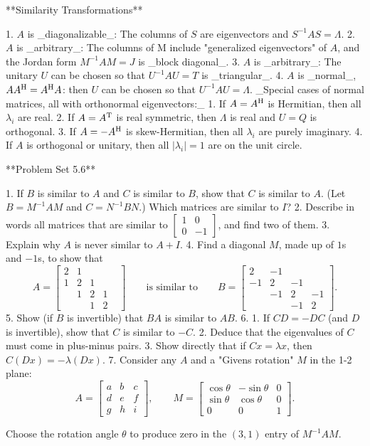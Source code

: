 

**Similarity Transformations**

1. \(A\) is _diagonalizable_: The columns of \(S\) are eigenvectors and \(S^{-1}AS=\Lambda\).
2. \(A\) is _arbitrary_: The columns of M include "generalized eigenvectors" of \(A\), and the Jordan form \(M^{-1}AM=J\) is _block diagonal_.
3. \(A\) is _arbitrary_: The unitary \(U\) can be chosen so that \(U^{-1}AU=T\) is _triangular_.
4. \(A\) is _normal_, \(AA^{\rm H}=A^{\rm H}A\): then \(U\) can be chosen so that \(U^{-1}AU=\Lambda\). _Special cases of normal matrices, all with orthonormal eigenvectors:_ 1. If \(A=A^{\rm H}\) is Hermitian, then all \(\lambda_{i}\) are real. 2. If \(A=A^{\rm T}\) is real symmetric, then \(\Lambda\) is real and \(U=Q\) is orthogonal. 3. If \(A=-A^{\rm H}\) is skew-Hermitian, then all \(\lambda_{i}\) are purely imaginary. 4. If \(A\) is orthogonal or unitary, then all \(|\lambda_{i}|=1\) are on the unit circle.

**Problem Set 5.6**

1. If \(B\) is similar to \(A\) and \(C\) is similar to \(B\), show that \(C\) is similar to \(A\). (Let \(B=M^{-1}AM\) and \(C=N^{-1}BN\).) Which matrices are similar to \(I\)?
2. Describe in words all matrices that are similar to \(\left[\begin{smallmatrix}1&0\\ 0&-1\end{smallmatrix}\right]\), and find two of them.
3. Explain why \(A\) is never similar to \(A+I\).
4. Find a diagonal \(M\), made up of \(1\)s and \(-1\)s, to show that \[A=\begin{bmatrix}2&1&&\\ 1&2&1&\\ &1&2&1&\\ &&1&2\end{bmatrix}\qquad\text{is similar to}\qquad B=\begin{bmatrix}2&-1&&\\ -1&2&-1&\\ &-1&2&-1\\ &&-1&2\end{bmatrix}.\]
5. Show (if \(B\) is invertible) that \(BA\) is similar to \(AB\).
6. 1. If \(CD=-DC\) (and \(D\) is invertible), show that \(C\) is similar to \(-C\). 2. Deduce that the eigenvalues of \(C\) must come in plus-minus pairs. 3. Show directly that if \(Cx=\lambda x\), then \(C(Dx)=-\lambda(Dx)\).
7. Consider any \(A\) and a "Givens rotation" \(M\) in the 1-2 plane: \[A=\begin{bmatrix}a&b&c\\ d&e&f\\ g&h&i\end{bmatrix},\qquad M=\begin{bmatrix}\cos\theta&-\sin\theta&0\\ \sin\theta&\cos\theta&0\\ 0&0&1\end{bmatrix}.\]

Choose the rotation angle \(\theta\) to produce zero in the \((3,1)\) entry of \(M^{-1}AM\).

